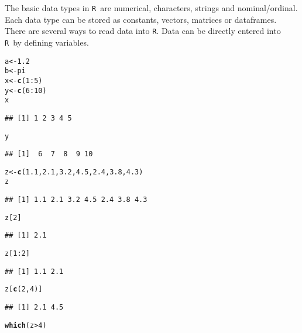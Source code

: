 \documentclass[12pt,A4,makeidx]{article}\usepackage[]{graphicx}\usepackage[]{xcolor}
\makeatletter
\newcommand{\hlnum}[1]{\textcolor[rgb]{0.686,0.059,0.569}{#1}}%
\newcommand{\hlopt}[1]{\textcolor[rgb]{0,0,0}{#1}}%
\newcommand{\hlstd}[1]{\textcolor[rgb]{0.345,0.345,0.345}{#1}}%
\newcommand{\hlkwb}[1]{\textcolor[rgb]{0.69,0.353,0.396}{#1}}%
\newcommand{\hlkwd}[1]{\textcolor[rgb]{0.737,0.353,0.396}{\textbf{#1}}}%
\newenvironment{kframe}{%
 \def\at@end@of@kframe{}%
 \ifinner\ifhmode%
  \def\at@end@of@kframe{\end{minipage}}%
  \begin{minipage}{\columnwidth}%
 \fi\fi%
 \def\FrameCommand##1{\hskip\@totalleftmargin \hskip-\fboxsep
 \colorbox{shadecolor}{##1}\hskip-\fboxsep
     \hskip-\linewidth \hskip-\@totalleftmargin \hskip\columnwidth}%
 \MakeFramed {\advance\hsize-\width
   \@totalleftmargin\z@ \linewidth\hsize
   \@setminipage}}%
 {\par\unskip\endMakeFramed%
 \at@end@of@kframe}
\newenvironment{knitrout}{}{} %
\newcommand{\tR}{\texttt{R}}
\makeatother
\begin{document}
The basic data types in \tR \ are numerical, characters, strings and nominal/ordinal. Each data type can be stored 
as constants, vectors, matrices or dataframes.
There are several ways to read data into \tR.
Data can be directly entered into \tR\ by defining variables.
\begin{knitrout}
\color{fgcolor}\begin{kframe}
\begin{alltt}
\hlstd{a}\hlkwb{<-}\hlnum{1.2}
\hlstd{b}\hlkwb{<-}\hlstd{pi}
\hlstd{x}\hlkwb{<-}\hlkwd{c}\hlstd{(}\hlnum{1}\hlopt{:}\hlnum{5}\hlstd{)}
\hlstd{y}\hlkwb{<-}\hlkwd{c}\hlstd{(}\hlnum{6}\hlopt{:}\hlnum{10}\hlstd{)}
\hlstd{x}
\end{alltt}
\begin{verbatim}
## [1] 1 2 3 4 5
\end{verbatim}
\begin{alltt}
\hlstd{y}
\end{alltt}
\begin{verbatim}
## [1]  6  7  8  9 10
\end{verbatim}
\begin{alltt}
\hlstd{z}\hlkwb{<-}\hlkwd{c}\hlstd{(}\hlnum{1.1}\hlstd{,}\hlnum{2.1}\hlstd{,}\hlnum{3.2}\hlstd{,}\hlnum{4.5}\hlstd{,}\hlnum{2.4}\hlstd{,}\hlnum{3.8}\hlstd{,}\hlnum{4.3}\hlstd{)}
\hlstd{z}
\end{alltt}
\begin{verbatim}
## [1] 1.1 2.1 3.2 4.5 2.4 3.8 4.3
\end{verbatim}
\begin{alltt}
\hlstd{z[}\hlnum{2}\hlstd{]}
\end{alltt}
\begin{verbatim}
## [1] 2.1
\end{verbatim}
\begin{alltt}
\hlstd{z[}\hlnum{1}\hlopt{:}\hlnum{2}\hlstd{]}
\end{alltt}
\begin{verbatim}
## [1] 1.1 2.1
\end{verbatim}
\begin{alltt}
\hlstd{z[}\hlkwd{c}\hlstd{(}\hlnum{2}\hlstd{,}\hlnum{4}\hlstd{)]}
\end{alltt}
\begin{verbatim}
## [1] 2.1 4.5
\end{verbatim}
\begin{alltt}
\hlkwd{which}\hlstd{(z}\hlopt{>}\hlnum{4}\hlstd{)}
\end{alltt}
\begin{verbatim}

\end{verbatim}
\end{kframe}
\end{knitrout}
\end{document}
